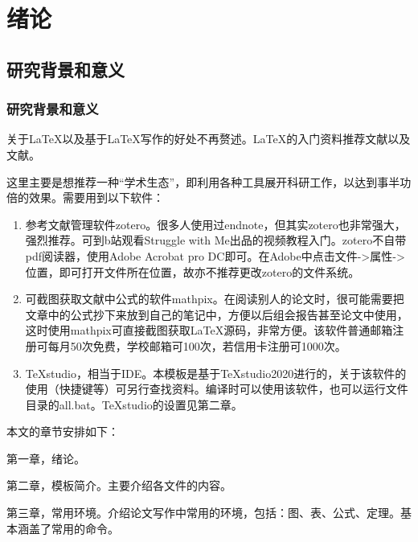 \chapter{绪论}
%
\section{研究背景和意义}
\subsection{研究背景和意义}
%
关于\LaTeX{}以及基于\LaTeX{}写作的好处不再赘述。\LaTeX{}的入门资料推荐文献\parencite{_g}以及文献\parencite{_c}。

这里主要是想推荐一种“学术生态”，即利用各种工具展开科研工作，以达到事半功倍的效果。需要用到以下软件：
\begin{enumerate}
	\item 	参考文献管理软件zotero\cite{_m}。很多人使用过endnote，但其实zotero也非常强大，强烈推荐。可到b站观看Struggle with Me出品的视频教程\cite{_k}入门。zotero不自带pdf阅读器，使用Adobe Acrobat pro DC即可。在Adobe中点击文件->属性->位置，即可打开文件所在位置，故亦不推荐更改zotero的文件系统。
	\item	可截图获取文献中公式的软件mathpix\cite{_h}。在阅读别人的论文时，很可能需要把文章中的公式抄下来放到自己的笔记中，方便以后组会报告甚至论文中使用，这时使用mathpix可直接截图获取\LaTeX{}源码，非常方便。该软件普通邮箱注册可每月50次免费，学校邮箱可100次，若信用卡注册可1000次。	
	\item	TeXstudio，相当于IDE。本模板是基于TeXstudio2020进行的，关于该软件的使用（快捷键等）可另行查找资料。编译时可以使用该软件，也可以运行文件目录的all.bat。TeXstudio的设置见第二章。
\end{enumerate}

本文的章节安排如下：

第一章，绪论。

第二章，模板简介。主要介绍各文件的内容。

第三章，常用环境。介绍论文写作中常用的环境，包括：图、表、公式、定理。基本涵盖了常用的命令。



